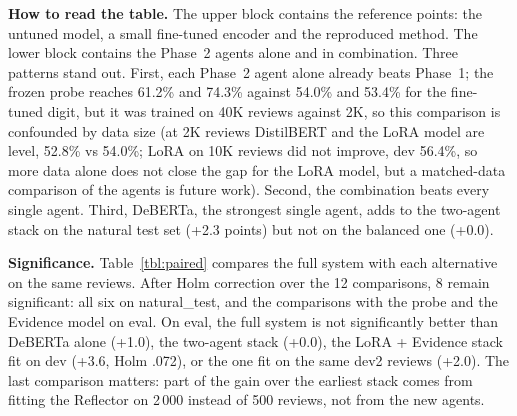 \documentclass[runningheads]{llncs}
\begin{document}
\textbf{How to read the table.} The upper block contains the reference points: the untuned model, a small fine-tuned encoder and the reproduced method. The lower block contains the Phase~2 agents alone and in combination. Three patterns stand out. First, each Phase~2 agent alone already beats Phase~1; the frozen probe reaches 61.2\% and 74.3\% against 54.0\% and 53.4\% for the fine-tuned digit, but it was trained on 40K reviews against 2K, so this comparison is confounded by data size (at 2K reviews DistilBERT and the LoRA model are level, 52.8\% vs 54.0\%; LoRA on 10K reviews did not improve, dev 56.4\%, so more data alone does not close the gap for the LoRA model, but a matched-data comparison of the agents is future work). Second, the combination beats every single agent. Third, DeBERTa, the strongest single agent, adds to the two-agent stack on the natural test set (+2.3 points) but not on the balanced one (+0.0).

\textbf{Significance.} Table~\ref{tbl:paired} compares the full system with each alternative on the same reviews. After Holm correction over the 12 comparisons, 8 remain significant: all six on natural\_test, and the comparisons with the probe and the Evidence model on eval. On eval, the full system is not significantly better than DeBERTa alone (+1.0), the two-agent stack (+0.0), the LoRA + Evidence stack fit on dev (+3.6, Holm .072), or the one fit on the same dev2 reviews (+2.0). The last comparison matters: part of the gain over the earliest stack comes from fitting the Reflector on 2\,000 instead of 500 reviews, not from the new agents.

\begin{table}[t]
\centering
\caption{Paired comparisons of the full system against each alternative: difference in exact accuracy (points), exact McNemar $p$, and Holm-adjusted $p$ over these 12 comparisons.}
\label{tbl:paired}
\small
{}
\end{table}
\end{document}
